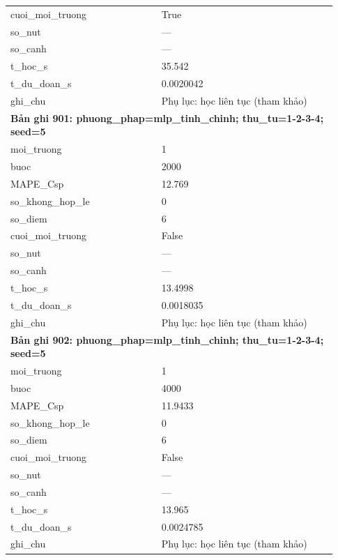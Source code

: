 \begin{longtable}{p{0.43\linewidth}p{0.50\linewidth}}
cuoi\_\allowbreak moi\_\allowbreak truong & True \\
so\_\allowbreak nut & — \\
so\_\allowbreak canh & — \\
t\_\allowbreak hoc\_\allowbreak s & 35.542 \\
t\_\allowbreak du\_\allowbreak doan\_\allowbreak s & 0.0020042 \\
ghi\_\allowbreak chu & Phụ lục: học liên tục (tham khảo) \\
\midrule
\multicolumn{2}{p{0.95\linewidth}}{\textbf{Bản ghi 901: phuong\_phap=mlp\_tinh\_chinh; thu\_tu=1-2-3-4; seed=5}} \\
moi\_\allowbreak truong & 1 \\
buoc & 2000 \\
MAPE\_\allowbreak Csp & 12.769 \\
so\_\allowbreak khong\_\allowbreak hop\_\allowbreak le & 0 \\
so\_\allowbreak diem & 6 \\
cuoi\_\allowbreak moi\_\allowbreak truong & False \\
so\_\allowbreak nut & — \\
so\_\allowbreak canh & — \\
t\_\allowbreak hoc\_\allowbreak s & 13.4998 \\
t\_\allowbreak du\_\allowbreak doan\_\allowbreak s & 0.0018035 \\
ghi\_\allowbreak chu & Phụ lục: học liên tục (tham khảo) \\
\midrule
\multicolumn{2}{p{0.95\linewidth}}{\textbf{Bản ghi 902: phuong\_phap=mlp\_tinh\_chinh; thu\_tu=1-2-3-4; seed=5}} \\
moi\_\allowbreak truong & 1 \\
buoc & 4000 \\
MAPE\_\allowbreak Csp & 11.9433 \\
so\_\allowbreak khong\_\allowbreak hop\_\allowbreak le & 0 \\
so\_\allowbreak diem & 6 \\
cuoi\_\allowbreak moi\_\allowbreak truong & False \\
so\_\allowbreak nut & — \\
so\_\allowbreak canh & — \\
t\_\allowbreak hoc\_\allowbreak s & 13.965 \\
t\_\allowbreak du\_\allowbreak doan\_\allowbreak s & 0.0024785 \\
ghi\_\allowbreak chu & Phụ lục: học liên tục (tham khảo) \\

\end{longtable}
